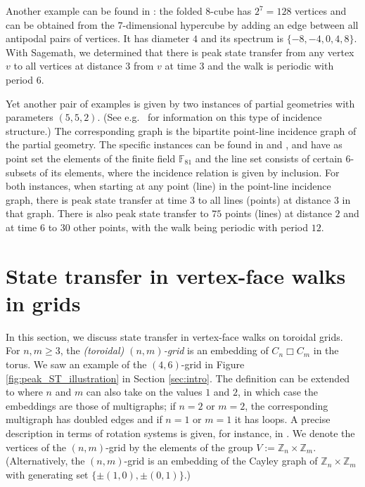 \documentclass{article}
\numberwithin{equation}{section}
\DeclareMathOperator{\boxprod}{\mathbin{\Box}}
\newcommand\ints{{\mathbb Z}}
\begin{document}
Another example can be found in \cite{BroCohNeu1989}: the folded $8$-cube has $2^7 = 128$ vertices and can be obtained from the $7$-dimensional hypercube by adding an edge between all antipodal pairs of vertices. It has diameter $4$ and its spectrum is $\{-8,-4,0,4,8\}$. With Sagemath, we determined that there is peak state transfer from any vertex $v$ to all vertices at distance $3$ from $v$ at time $3$ and the walk is periodic with period $6$. 

Yet another pair of examples is given by two instances of partial geometries with parameters $(5,5,2)$. (See e.g.\ \cite{ColDin2007} for information on this type of incidence structure.) The corresponding graph is the bipartite point-line incidence graph of the partial geometry. The specific instances can be found in \cite{LinSch1981} and \cite{Ved2021}, and have as point set the elements of the finite field $\mathbb{F}_{81}$ and the line set consists of certain $6$-subsets of its elements, where the incidence relation is given by inclusion. For both instances, when starting at any point (line) in the point-line incidence graph, there is peak state transfer at time $3$ to all lines (points) at distance $3$ in that graph. There is also peak state transfer to $75$ points (lines) at distance $2$ and at time $6$ to $30$ other points, with the walk being periodic with period $12$.









\section{State transfer in vertex-face walks in grids}\label{sec:grids}

In this section, we discuss state transfer in vertex-face walks on toroidal grids. For $n,m \geq 3$, the \textsl{(toroidal) $(n,m)$-grid} is an embedding of $C_n \boxprod C_m$ in the torus. We saw an example of the $(4,6)$-grid in Figure \ref{fig:peak_ST_illustration} in Section \ref{sec:intro}.  The definition can be extended to where $n$ and $m$ can also take on the values $1$ and $2$, in which case the embeddings are those of multigraphs; if $n=2$ or $m=2$, the corresponding multigraph has doubled edges and if $n=1$ or $m=1$ it has loops. A precise description in terms of rotation systems is given, for instance, in \cite{GuoSch2024}. We denote the vertices of the $(n,m)$-grid by the elements of the group $V:= \ints_n \times \ints_m$. (Alternatively, the $(n,m)$-grid is an embedding of the Cayley graph of $\ints_n \times \ints_m$ with generating set $\{\pm (1,0),\pm (0,1)\}$.)
\end{document}
